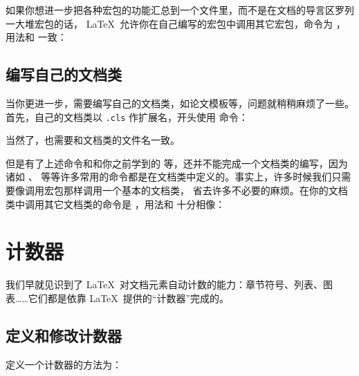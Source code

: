 如果你想进一步把各种宏包的功能汇总到一个文件里，而不是在文档的导言区罗列一大堆宏包的话，
\LaTeX\ 允许你在自己编写的宏包中调用其它宏包，命令为 ，用法和 
一致：
\begin{command}
\end{command}

\subsection{编写自己的文档类}

当你更进一步，需要编写自己的文档类，如论文模板等，问题就稍稍麻烦了一些。首先，自己的文档类以 \texttt{.cls} 作扩展名，开头使用
 命令：
\begin{command}
\end{command}
当然了，也需要和文档类的文件名一致。

但是有了上述命令和和你之前学到的  等，还并不能完成一个文档类的编写，因为诸如 、
 等等许多常用的命令都是在文档类中定义的。事实上，许多时候我们只需要像调用宏包那样调用一个基本的文档类，
省去许多不必要的麻烦。在你的文档类中调用其它文档类的命令是  ，用法和  十分相像：
\begin{command}
\end{command}

\section{计数器}\label{sec:counters}

我们早就见识到了 \LaTeX\ 对文档元素自动计数的能力：章节符号、列表、图表……它们都是依靠 \LaTeX\ 提供的“计数器”完成的。

\subsection{定义和修改计数器}\label{subsec:count-defs}

定义一个计数器的方法为：
\begin{command}
 \\
\end{command}

